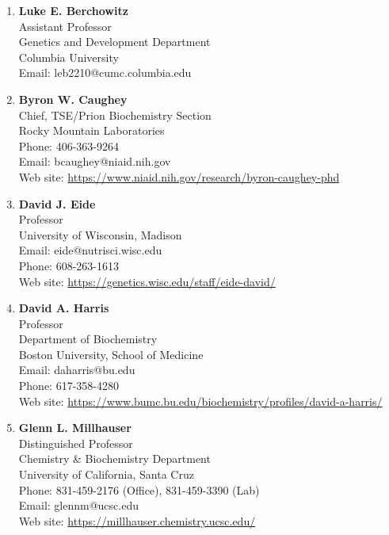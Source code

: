 \documentclass{letter}
\begin{document}
\begin{letter}{}
\begin{enumerate}
\item \textbf{Luke E. Berchowitz}\\ Assistant Professor \\ Genetics and Development Department\\
Columbia University\\
Email: leb2210@cumc.columbia.edu
\item \textbf{Byron W. Caughey}\\
Chief, TSE/Prion Biochemistry Section\\
Rocky Mountain Laboratories\\
Phone: 406-363-9264\\
Email: bcaughey@niaid.nih.gov\\
Web site: \url{https://www.niaid.nih.gov/research/byron-caughey-phd}
\item \textbf{David J. Eide}\\
Professor\\
University of Wisconsin, Madison\\
Email: eide@nutrisci.wisc.edu\\
Phone: 608-263-1613\\
Web site: \url{https://genetics.wisc.edu/staff/eide-david/}
\item \textbf{David A. Harris}\\
Professor\\
Department of Biochemistry\\
Boston University, School of Medicine\\
Email: daharris@bu.edu\\
Phone: 617-358-4280\\
Web site: \url{https://www.bumc.bu.edu/biochemistry/profiles/david-a-harris/}
\item \textbf{Glenn L. Millhauser}\\
Distinguished Professor\\
Chemistry \& Biochemistry Department\\
University of California, Santa Cruz\\
Phone: 831-459-2176 (Office), 831-459-3390 (Lab)\\
Email: glennm@ucsc.edu\\
Web site: \url{https://millhauser.chemistry.ucsc.edu/}
\end{enumerate}



\end{letter}
\end{document}
